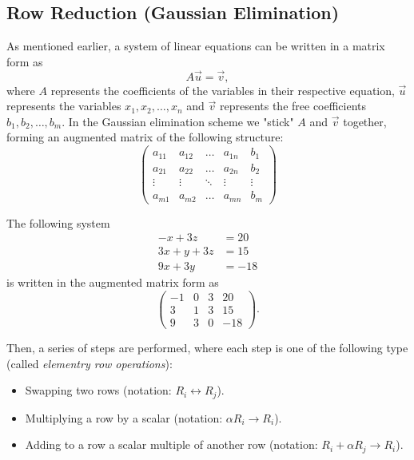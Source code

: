 \subsection{Row Reduction (Gaussian Elimination)}
As mentioned earlier, a system of linear equations can be written in a matrix form as
\begin{equation*}
  A\vec{u} = \vec{v},
\end{equation*}
where $A$ represents the coefficients of the variables in their respective equation, $\vec{u}$ represents the variables $x_{1}, x_{2}, \dots, x_{n}$ and $\vec{v}$ represents the free coefficients $b_{1}, b_{2}, \dots, b_{m}$. In the Gaussian elimination scheme we "stick" $A$ and $\vec{v}$ together, forming an augmented matrix of the following structure:
\begin{equation*}
  \left(\begin{array}{cccc|c}
  a_{11} & a_{12} & \dots & a_{1n} & b_{1}\\
  a_{21} & a_{22} & \dots & a_{2n} & b_{2}\\
  \vdots & \vdots & \ddots & \vdots & \vdots\\
  a_{m1} & a_{m2} & \dots & a_{mn} & b_{m}
  \end{array}\right)
\end{equation*}

\begin{example}
  The following system
  \begin{align*}
  -x + 3z &= 20\\
  3x + y + 3z &= 15\\
  9x + 3y &= -18
  \end{align*}
  is written in the augmented matrix form as
  \begin{equation*}
  \left(\begin{array}{ccc|c}
    -1 & 0 & 3 & 20\\
    3  & 1 & 3 & 15\\
    9  & 3 & 0 & -18
  \end{array}\right).
  \end{equation*}
\end{example}

Then, a series of steps are performed, where each step is one of the following type (called \emph{elementry row operations}):
\begin{itemize}
  \item Swapping two rows (notation: $R_{i} \leftrightarrow R_{j}$).
  \item Multiplying a row by a scalar (notation: $\alpha R_{i} \rightarrow R_{i}$).
  \item Adding to a row a scalar multiple of another row (notation: $R_{i}+\alpha R_{j} \rightarrow R_{i}$).
\end{itemize}

